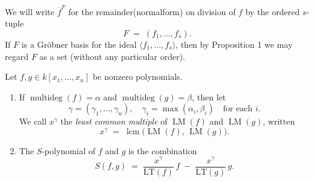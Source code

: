 \begin{definition}\label{def:Remainder} %
    \leanok 
    We will write \(\overline{f}^F\) for the remainder(normalform) on division of \(f\) by the ordered \(s\)-tuple
    \[
    F \;=\;(f_1,\dots,f_s).
    \]
    If \(F\) is a Gr{\"o}bner basis for the ideal \(\langle f_1,\dots,f_s\rangle\), then by Proposition 1
    we may regard \(F\) as a set (without any particular order).
\end{definition}

\begin{definition}\label{def:S-polynomial} %
    \leanok 
    Let \(f,g\in k[x_1,\dots,x_n]\) be nonzero polynomials.
    \begin{enumerate}
      \item If \(\operatorname{multideg}(f)=\alpha\) and \(\operatorname{multideg}(g)=\beta\), 
        then let 
        \[
          \gamma = (\gamma_1,\dots,\gamma_n),
          \quad
          \gamma_i = \max(\alpha_i,\beta_i)
          \quad\text{for each }i.
        \]
        We call \(x^\gamma\) the \emph{least common multiple} of \(\operatorname{LM}(f)\) and \(\operatorname{LM}(g)\),
        written
        \[
          x^\gamma \;=\;\operatorname{lcm}\bigl(\operatorname{LM}(f),\,\operatorname{LM}(g)\bigr).
        \]
      \item The \(S\)-polynomial of \(f\) and \(g\) is the combination
        \[
          S(f,g)
          \;=\;
          \frac{x^\gamma}{\mathrm{LT}(f)}\,f
          \;-\;
          \frac{x^\gamma}{\mathrm{LT}(g)}\,g.
        \]
    \end{enumerate}
\end{definition}

